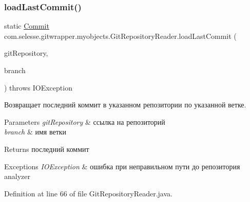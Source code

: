 \subsubsection{\texorpdfstring{load\+Last\+Commit()}{loadLastCommit()}}
{\footnotesize\ttfamily static \hyperlink{classcom_1_1selesse_1_1gitwrapper_1_1myobjects_1_1_commit}{Commit} com.\+selesse.\+gitwrapper.\+myobjects.\+Git\+Repository\+Reader.\+load\+Last\+Commit (\begin{DoxyParamCaption}\item[{\hyperlink{classcom_1_1selesse_1_1gitwrapper_1_1myobjects_1_1_git_repository}{Git\+Repository}}]{git\+Repository,  }\item[{\hyperlink{classcom_1_1selesse_1_1gitwrapper_1_1myobjects_1_1_branch}{Branch}}]{branch }\end{DoxyParamCaption}) throws I\+O\+Exception\hspace{0.3cm}{\ttfamily [static]}}

Возвращает последний коммит в указанном репозитории по указанной ветке.


\begin{DoxyParams}{Parameters}
{\em git\+Repository} & ссылка на репозиторий \\
\hline
{\em branch} & имя ветки \\
\hline
\end{DoxyParams}
\begin{DoxyReturn}{Returns}
последний коммит 
\end{DoxyReturn}

\begin{DoxyExceptions}{Exceptions}
{\em I\+O\+Exception} & ошибка при неправильном пути до репозитория analyzer \\
\hline
\end{DoxyExceptions}


Definition at line 66 of file Git\+Repository\+Reader.\+java.

\mbox{\label{classcom_1_1selesse_1_1gitwrapper_1_1myobjects_1_1_git_repository_reader_a1222bafab6af4b53b886a900351faaa6}} 
